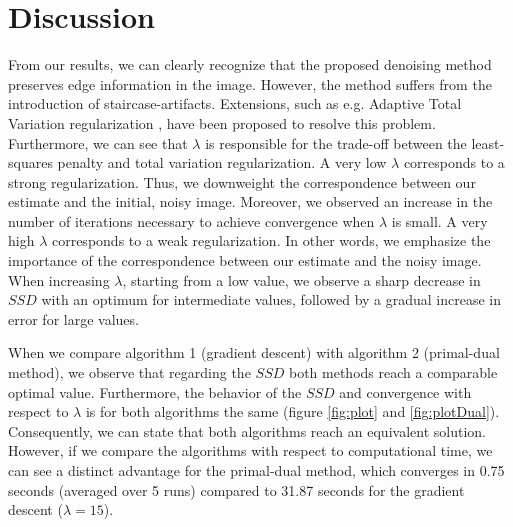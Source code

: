 \documentclass{paper}
\begin{document}
\section{Discussion}

From our results, we can clearly recognize that the proposed denoising method preserves edge information in the image. However, the method suffers from the introduction of staircase-artifacts. Extensions, such as e.g. Adaptive Total Variation regularization \cite{Chen2010}, have been proposed to resolve this problem. Furthermore, we can see that \begin{math}\lambda\end{math} is responsible for the trade-off between the least-squares penalty and total variation regularization. A very low \begin{math}\lambda\end{math} corresponds to a strong regularization. Thus, we downweight the correspondence between our estimate and the initial, noisy image. Moreover, we observed an increase in the number of iterations necessary to achieve convergence when \begin{math}\lambda\end{math} is small. A very high \begin{math}\lambda\end{math} corresponds to a weak regularization. In other words, we emphasize the importance of the correspondence between our estimate and the noisy image. When increasing \begin{math}\lambda\end{math}, starting from a low value, we observe a sharp decrease in \begin{math}SSD\end{math} with an optimum for intermediate values, followed by a gradual increase in error for large values.

When we compare algorithm 1 (gradient descent) with algorithm 2 (primal-dual method), we observe that regarding the \begin{math}SSD\end{math} both methods reach a comparable optimal value. Furthermore, the behavior of the \begin{math}SSD\end{math} and convergence with respect to \begin{math}\lambda\end{math} is for both algorithms the same (figure \ref{fig:plot} and \ref{fig:plotDual}). Consequently, we can state that both algorithms reach an equivalent solution. However, if we compare the algorithms with respect to computational time, we can see a distinct advantage for the primal-dual method, which converges in 0.75 seconds (averaged over 5 runs) compared to 31.87 seconds for the gradient descent (\begin{math}\lambda=15\end{math}).
\end{document}
